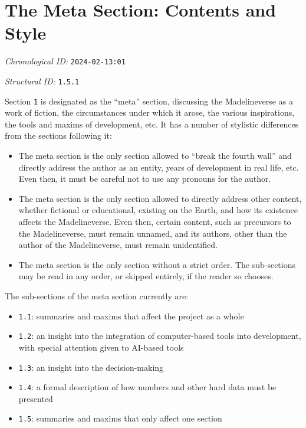 \section{The Meta Section: Contents and Style}
\emph{Chronological ID:} \texttt{2024-02-13:01}

\emph{Structural ID:} \texttt{1.5.1}

Section \texttt{1} is designated as the ``meta'' section, discussing the Madelineverse as a work of fiction, the circumstances under which it arose, the various inspirations, the tools and maxims of development, etc. It has a number of stylistic differences from the sections following it:

\begin{itemize}
  \item The meta section is the only section allowed to ``break the fourth wall'' and directly address the author as an entity, years of development in real life, etc. Even then, it must be careful not to use any pronouns for the author.
  \item The meta section is the only section allowed to directly address other content, whether fictional or educational, existing on the Earth, and how its existence affects the Madelineverse. Even then, certain content, such as precursors to the Madelineverse, must remain unnamed, and its authors, other than the author of the Madelineverse, must remain unidentified.
  \item The meta section is the only section without a strict order. The sub-sections may be read in any order, or skipped entirely, if the reader so chooses.
\end{itemize}

The sub-sections of the meta section currently are:

\begin{itemize}
  \item \texttt{1.1}: summaries and maxims that affect the project as a whole
  \item \texttt{1.2}: an insight into the integration of computer-based tools into development, with special attention given to AI-based tools
  \item \texttt{1.3}: an insight into the decision-making
  \item \texttt{1.4}: a formal description of how numbers and other hard data must be presented
  \item \texttt{1.5}: summaries and maxims that only affect one section
\end{itemize}
\newpage
